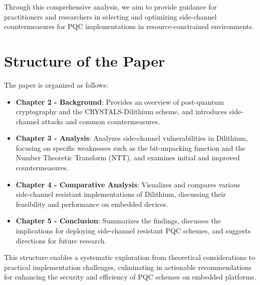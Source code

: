 Through this comprehensive analysis, we aim to provide guidance for practitioners and researchers in selecting and optimizing side-channel countermeasures for PQC implementations in resource-constrained environments.

\section{Structure of the Paper}

The paper is organized as follows:

\begin{itemize}
    \item \textbf{Chapter 2 - Background}: Provides an overview of post-quantum cryptography and the CRYSTALS-Dilithium scheme, and introduces side-channel attacks and common countermeasures.
    \item \textbf{Chapter 3 - Analysis}: Analyzes side-channel vulnerabilities in Dilithium, focusing on specific weaknesses such as the bit-unpacking function and the Number Theoretic Transform (NTT), and examines initial and improved countermeasures.
    \item \textbf{Chapter 4 - Comparative Analysis}: Visualizes and compares various side-channel resistant implementations of Dilithium, discussing their feasibility and performance on embedded devices.
    \item \textbf{Chapter 5 - Conclusion}: Summarizes the findings, discusses the implications for deploying side-channel resistant PQC schemes, and suggests directions for future research.
\end{itemize}

This structure enables a systematic exploration from theoretical considerations to practical implementation challenges, culminating in actionable recommendations for enhancing the security and efficiency of PQC schemes on embedded platforms.
